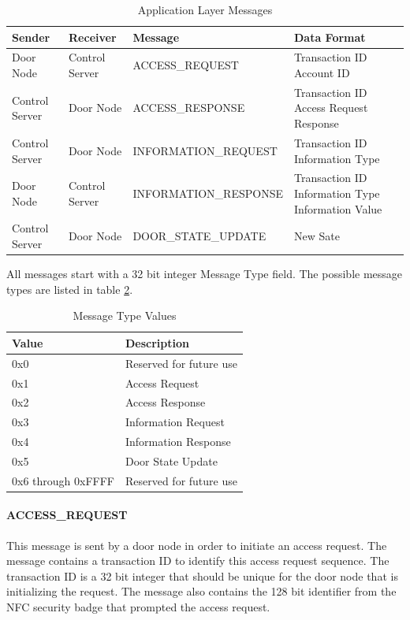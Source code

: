 \begin{table}[htb]
\begin{tabular}{ l | l | l | p{4.5cm} }
\toprule
Sender & Receiver & Message & Data Format\\
\midrule
Door Node & Control Server & ACCESS\_REQUEST &
Transaction ID \newline Account ID\\
\hline
Control Server & Door Node & ACCESS\_RESPONSE &
Transaction ID \newline Access Request Response\\
\hline
Control Server & Door Node & INFORMATION\_REQUEST &
Transaction ID \newline Information Type\\
\hline
Door Node & Control Server & INFORMATION\_RESPONSE &
Transaction ID \newline Information Type \newline Information Value\\
\hline
Control Server & Door Node & DOOR\_STATE\_UPDATE & New Sate\\
\bottomrule
\end{tabular}
\caption{Application Layer Messages}
\label{tab:app-layer-messages}
\end{table}

All messages start with a 32 bit integer Message Type field. The possible
message types are listed in table \ref{tab:message-types}.

\begin{table}[htb]
\centering
\begin{tabular}{@{}ll@{}}
\toprule
Value               &   Description \\
\midrule
0x0                 &   Reserved for future use \\
0x1                 &   Access Request \\
0x2                 &   Access Response \\
0x3                 &   Information Request \\
0x4                 &   Information Response \\
0x5                 &   Door State Update \\
0x6 through 0xFFFF  &   Reserved for future use \\
\bottomrule
\end{tabular}
\caption{Message Type Values}
\label{tab:message-types}
\end{table}

\paragraph{ACCESS\_REQUEST}
This message is sent by a door node in order to initiate an access request. The
message contains a transaction ID to identify this access request sequence. The
transaction ID is a 32 bit integer that should be unique for the door node that
is initializing the request. The message also contains the 128 bit identifier
from the NFC security badge that prompted the access request.

